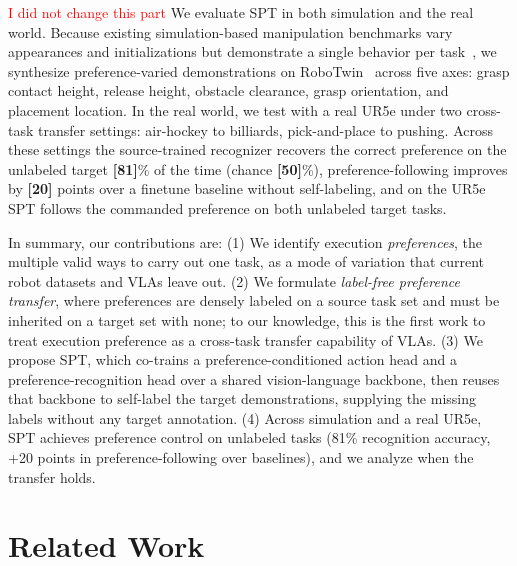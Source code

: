 \documentclass{article}
\begin{document}
\textcolor{red}{I did not change this part}
We evaluate SPT in both simulation and the real world. Because existing simulation-based manipulation benchmarks vary appearances and initializations but demonstrate a single behavior per task~\citep{libero, liberoplus}, we synthesize preference-varied demonstrations on RoboTwin~\citep{robotwin} across five axes: grasp contact height, release height, obstacle clearance, grasp orientation, and placement location. In the real world, we test with a real UR5e under two cross-task transfer settings: air-hockey to billiards, pick-and-place to pushing.
Across these settings the source-trained recognizer recovers the correct preference on the unlabeled target \textbf{[81]}\% of the time (chance \textbf{[50]}\%), preference-following improves by \textbf{[20]} points over a finetune baseline without self-labeling, and on the UR5e SPT follows the commanded preference on both unlabeled target tasks.

In summary, our contributions are:
(1) We identify execution \emph{preferences}, the multiple valid ways to carry out one task, as a mode of variation that current robot datasets and VLAs leave out.
(2) We formulate \emph{label-free preference transfer}, where preferences are densely labeled on a source task set and must be inherited on a target set with none; to our knowledge, this is the first work to treat execution preference as a cross-task transfer capability of VLAs.
(3) We propose SPT, which co-trains a preference-conditioned action head and a preference-recognition head over a shared vision-language backbone, then reuses that backbone to self-label the target demonstrations, supplying the missing labels without any target annotation.
(4) Across simulation and a real UR5e, SPT achieves preference control on unlabeled tasks (81\% recognition accuracy, +20 points in preference-following over baselines), and we analyze when the transfer holds.

 




\section{Related Work}
\label{sec:related}
\end{document}
